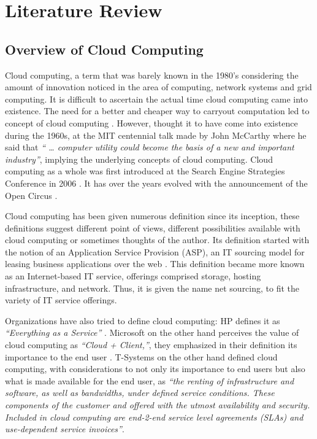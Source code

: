 \chapter{Literature Review}\label{chapter:literature_review}
\section{Overview of Cloud Computing}\label{section:overview_cloud_computing}
Cloud computing, a term that was barely known in the 1980's considering the amount of innovation noticed in the area of computing, network systems and grid computing. It is difficult to ascertain the actual time cloud computing came into existence. The need for a better and cheaper way to carryout computation led to concept of cloud computing \cite{qian2009cloud}. However, \cite{arutyunov2012cloud} thought it to have come into existence during the 1960s, at the MIT centennial talk made by John McCarthy where he said that \textit{“ … computer utility could become the basis of a new and important industry”}, implying the underlying concepts of cloud computing. Cloud computing as a whole was first introduced at the Search Engine Strategies Conference in 2006 \cite{sullivan2006conversation}. It has over the years evolved with the announcement of the Open Circus \cite{campbell2009open}. 

Cloud computing has been given numerous definition since its inception, these definitions suggest different point of views, different possibilities available with cloud computing or sometimes thoughts of the author. Its definition started with the notion of an Application Service Provision (ASP), an IT sourcing model for leasing business applications over the web \cite{susarla2006understanding}. This definition became more known as an Internet-based IT service, offerings comprised storage, hosting
infrastructure, and network. Thus, it is given the name net sourcing, to fit the variety of IT service offerings. 

Organizations have also tried to define cloud computing: HP defines it as \textit{“Everything as a Service”} \cite{robison2009everything}. Microsoft on the other hand perceives the value of cloud computing as \textit{“Cloud + Client,”}, they emphasized in their definition its importance to the end user \cite{xin2011cloud}. T-Systems on the other hand defined cloud computing, with considerations to not only its importance to end users but also what is made available for the end user,  as \textit{“the renting of infrastructure and software, as well as bandwidths, under defined service conditions. These components of the customer and offered with the utmost availability and security. Included in cloud computing are end-2-end service level agreements (SLAs) and use-dependent service invoices”}. 

